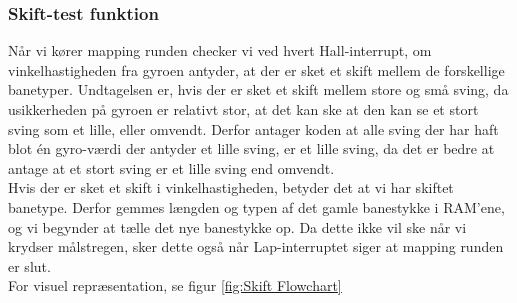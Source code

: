 \subsubsection{Skift-test funktion}

Når vi kører mapping runden checker vi ved hvert Hall-interrupt, om vinkelhastigheden fra gyroen antyder, at der er sket et skift mellem de forskellige banetyper. Undtagelsen er, hvis der er sket et skift mellem store og små sving, da usikkerheden på gyroen er relativt stor, at det kan ske at den kan se et stort sving som et lille, eller omvendt. Derfor antager koden at alle sving der har haft blot én gyro-værdi der antyder et lille sving, er et lille sving, da det er bedre at antage at et stort sving er et lille sving end omvendt. 
\\
Hvis der er sket et skift i vinkelhastigheden, betyder det at vi har skiftet banetype. Derfor gemmes længden og typen af det gamle banestykke i RAM'ene, og vi begynder at tælle det nye banestykke op. Da dette ikke vil ske når vi krydser målstregen, sker dette også når Lap-interruptet siger at mapping runden er slut.
\\
For visuel repræsentation, se figur \ref{fig:Skift Flowchart}

